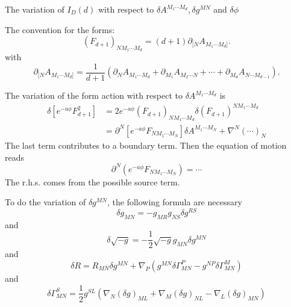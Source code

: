 The variation of $I_{D}(d)$ with respect to
$\delta A^{M_1\cdots M_d},\delta g^{MN}$ and $\delta\phi$

\begin{info}
The convention for the forms:
\[
	(F_{d+1})_{N M_1 \cdots M_d} = (d+1) \partial_{[N} A_{M_1\cdots M_d]}
.\] 
with
\[
\partial_{[N} A_{M_1\cdots M_d]} = \frac{1}{d+1}
\left( \partial_{N} A_{M_1\cdots M_d} +\partial_{M_1} A_{M_2\cdots N} +\cdots+\partial_{M_d} A_{N\cdots M_{d-1}}  
 \right) 
.\] 
\end{info}

The variation of the form action with respect to $\delta A^{M_1\cdots M_d}$ is
\begin{align*}
	\delta \left[e^{-a \phi} F_{d+1}^2\right] &= 2 e^{-a \phi} (F_{d+1})_{N M_1 \cdots M_d}
	\delta (F_{d+1})^{N M_1 \cdots M_d} \\
	&= \partial^N \left[ e^{-a\phi} F_{N M_1\cdots M_N} \right] 
	\delta A^{M_1\cdots M_N}
	+ \nabla^N (\cdots)_N
\end{align*}
The last term contributes to a boundary term.
Then the equation of motion reads
\begin{equation}
	\partial^N \left( e^{-a\phi} F_{N M_1\cdots M_N} \right) = \cdots 	
\end{equation}
The r.h.s. comes from the possible source term.

\begin{info}
	To do the variation of $\delta g^{MN}$,
	the following formula are necessary
	\begin{equation}
		\delta g_{MN} = - g_{MR} g_{NS} \delta g^{RS}
	\end{equation}
	and
	\begin{equation}
		\delta \sqrt{-g} = - \frac{1}{2} \sqrt{-g}
		g_{MN}\delta g^{MN}
	\end{equation}
	and
	\begin{equation}
		\delta R = R_{MN} \delta g^{MN}
		+ \nabla_{P} (g^{MN}\delta \Gamma^P_{MN}
		-g^{NP}\delta\Gamma^M_{MN})
	\end{equation}
	and
	\begin{equation}
		\delta \Gamma^S_{MN} = \frac{1}{2} g^{SL}
		\left( \nabla_{N} (\delta g)_{ML} + \nabla_{M} (\delta g)_{NL}
		- \nabla_L (\delta g)_{MN}\right) 
	\end{equation}
\end{info}

